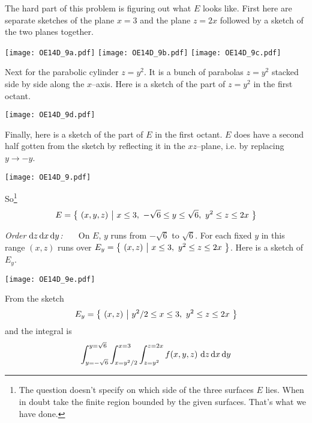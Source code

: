 \begin{solution}
The hard part of this problem is figuring out what $E$ looks like.
First here are separate sketches of the plane $x=3$ and the plane
$z=2x$ followed by a sketch of the two planes together.

\begin{center}
\texttt{[image: OE14D\_9a.pdf]}\qquad
\texttt{[image: OE14D\_9b.pdf]}\qquad
\texttt{[image: OE14D\_9c.pdf]}
\end{center} 

Next for the parabolic cylinder $z=y^2$. 
It is a bunch of parabolas $z=y^2$ stacked side by side along the $x$--axis. Here is a sketch of the part of  $z=y^2$ in the first octant.

\begin{center}
\texttt{[image: OE14D\_9d.pdf]}
\end{center} 

Finally, here is a sketch of the part of $E$ in the first octant.
$E$ does have a second half gotten from the sketch by reflecting it
in the $xz$--plane, i.e. by replacing $y\rightarrow-y$.

\begin{center}
\texttt{[image: OE14D\_9.pdf]}
\end{center} 

So\footnote{The question doesn't specify on which side of the three surfaces
$E$ lies. When in doubt take the finite region bounded by the given surfaces.
That's what we have done.}
\begin{equation*}
E = \big\{ \ (x,y,z)\ \big|\ x\le 3,\ -\sqrt{6}\le y\le \sqrt{6},\ y^2\le z\le 2x\ \big\}
\end{equation*}

\emph{Order $\mathrm{d}z\,\mathrm{d}x\,\mathrm{d}y$:\ \ \ }
On $E$, $y$ runs from $-\sqrt{6}$ to $\sqrt{6}$. For each fixed $y$
in this range $(x,z)$ runs over $E_y=\big\{ \ (x,z)\ \big|\ x\le 3,\ y^2\le z\le 2x\ \big\}$.
Here is a sketch of $E_y$.

\begin{center}
\texttt{[image: OE14D\_9e.pdf]}
\end{center} 

From the sketch
\begin{equation*}
E_y = \big\{ \ (x,z)\ \big|\ y^2/2\le x\le 3,\ y^2\le z\le 2x\ \big\}
\end{equation*}
and the integral is
\begin{equation*}
\int_{y=-\sqrt{6}}^{y=\sqrt{6}}\int_{x=y^2/2}^{x=3}\int_{z=y^2}^{z=2x}
                f(x,y,z)\ \mathrm{d}z\,\mathrm{d}x\,\mathrm{d}y 
\end{equation*} 



\end{solution}
